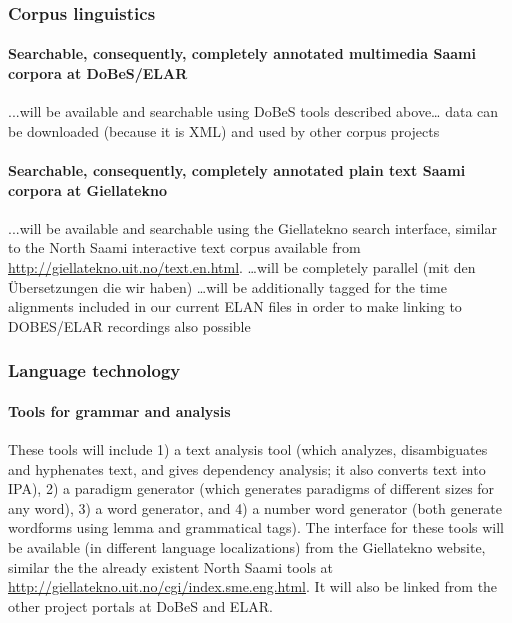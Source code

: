 \documentclass[a4paper,12pt]{article}
\begin{document}
\subsubsection{Corpus linguistics}
\paragraph{Searchable, consequently, completely annotated multimedia Saami corpora at DoBeS/ELAR}
...will be available and searchable using DoBeS tools described above… data can be downloaded (because it is XML) and used by other corpus projects
\paragraph{Searchable, consequently, completely annotated plain text Saami corpora at Giellatekno}
...will be available and searchable using the Giellatekno search interface, similar to the North Saami interactive text corpus available from \url{http://giellatekno.uit.no/text.en.html}.
…will be completely parallel (mit den Übersetzungen die wir haben)
…will be additionally tagged for the time alignments included in our current ELAN files in order to make linking to DOBES/ELAR recordings also possible

\subsubsection{Language technology}

\paragraph{Tools for grammar and analysis}
These tools will include 1) a text analysis tool (which analyzes, disambiguates and hyphenates text, and gives dependency analysis; it also converts text into IPA), 2) a paradigm generator (which generates paradigms of different sizes for any word), 3) a word generator, and 4) a number word generator (both generate wordforms using lemma and grammatical tags). The interface for these tools will be available (in different language localizations) from the Giellatekno website, similar the the already existent North Saami tools at \url{http://giellatekno.uit.no/cgi/index.sme.eng.html}. It will also be linked from the other project portals at DoBeS and ELAR.
\end{document}
